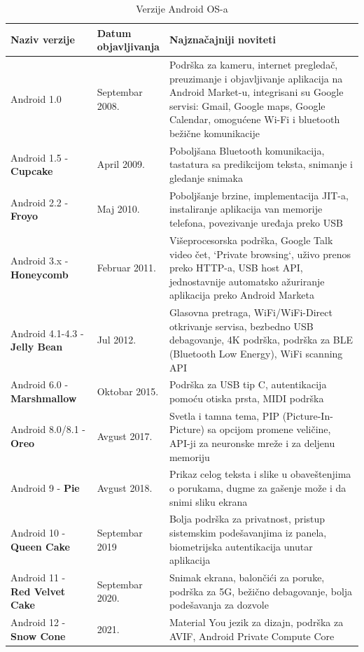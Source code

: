 \documentclass[android.tex]{subfiles}
\begin{document}
\begin{table}
\centering
\caption{Verzije Android OS-a}
\label{tbl:andrVerzije}
\begin{tabular}{p{0.25\linewidth} | p{0.15\linewidth}p{0.6\linewidth}}
\toprule
Naziv verzije & Datum objavljivanja & Najznačajniji noviteti \\
\toprule
Android 1.0 & Septembar 2008. & Podrška za kameru, internet pregledač, preuzimanje i objavljivanje aplikacija na Android Market-u, integrisani su Google servisi: Gmail, Google maps, Google Calendar, omogućene Wi-Fi i bluetooth bežične komunikacije\\\midrule
Android 1.5 - \textbf{Cupcake} & April 2009. & Poboljšana Bluetooth komunikacija, tastatura sa predikcijom teksta, snimanje i gledanje snimaka\\\midrule
Android 2.2 - \textbf{Froyo} & Maj 2010. & Poboljšanje brzine, implementacija JIT-a, instaliranje aplikacija van memorije telefona, povezivanje uređaja preko USB \\\midrule
Android 3.x - \textbf{Honeycomb} & Februar 2011. & Višeprocesorska podrška, Google Talk video čet, `Private browsing`, uživo prenos preko HTTP-a, USB host API, jednostavnije automatsko ažuriranje aplikacija preko Android Marketa\\\midrule
Android 4.1-4.3 - \textbf{Jelly Bean} & Jul 2012. & Glasovna pretraga, WiFi/WiFi-Direct otkrivanje servisa, bezbedno USB debagovanje, 4K podrška, podrška za BLE (Bluetooth Low Energy), WiFi scanning API\\\midrule
Android 6.0 - \textbf{Marshmallow} & Oktobar 2015. & Podrška za USB tip C, autentikacija pomoću otiska prsta, MIDI podrška\\\midrule
Android 8.0/8.1 - \textbf{Oreo} & Avgust 2017. & Svetla i tamna tema, PIP (Picture-In-Picture) sa opcijom promene veličine, API-ji za neuronske mreže i za deljenu memoriju\\\midrule
Android 9 - \textbf{Pie} & Avgust 2018. & Prikaz celog teksta i slike u obaveštenjima o porukama, dugme za gašenje može i da snimi sliku ekrana\\\midrule
Android 10 - \textbf{Queen Cake} & Septembar 2019 & Bolja podrška za privatnost, pristup sistemskim podešavanjima iz panela, biometrijska autentikacija unutar aplikacija\\\midrule
Android 11 - \textbf{Red Velvet Cake} & Septembar 2020. & Snimak ekrana, balončići za poruke, podrška za 5G, bežično debagovanje, bolja podešavanja za dozvole\\\midrule
Android 12 - \textbf{Snow Cone} & 2021. & Material You jezik za dizajn, podrška za AVIF, Android Private Compute Core\\
\bottomrule
\end{tabular}
\end{table}
\end{document}
